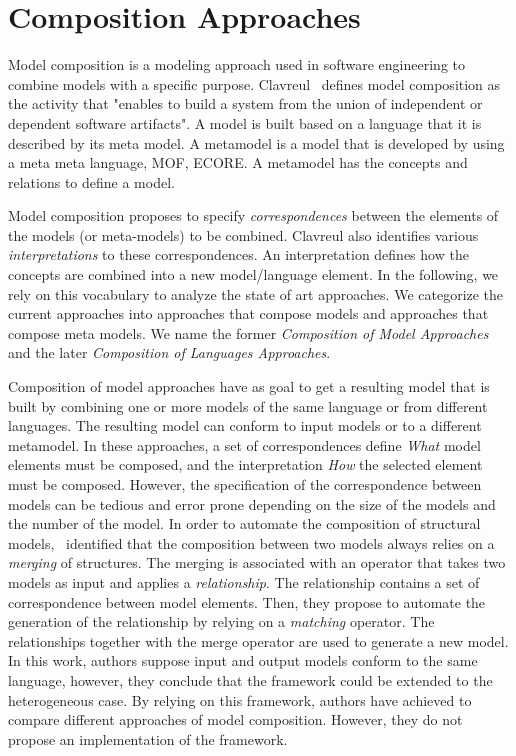 \section{Composition Approaches}
Model composition is a modeling approach used in software engineering to combine models with a specific purpose. Clavreul~\cite{clavreulmodelcompo} defines model composition as the activity that "enables to build a system from the union of independent or dependent software artifacts". A model is built based on a language that it is described by its meta model. A metamodel is a model that is developed by using a meta meta language, \eg MOF, ECORE. A metamodel has the concepts and relations to define a model.

Model composition proposes to specify \emph{correspondences} between the elements of the models (or meta-models) to be combined. Clavreul also identifies various \emph{interpretations} to these correspondences. An interpretation defines how the concepts are combined into a new model/language element. In the following, we rely on this vocabulary to analyze the state of art approaches. We categorize the current approaches into approaches that compose models and approaches that compose meta models. We name the former \emph{Composition of Model Approaches} and the later \emph{Composition of Languages Approaches}.    

Composition of model approaches have as goal to get a resulting model that is built by combining one or more models of the same language or from different languages. The resulting model can conform to input models or to a different metamodel. In these approaches, a set of correspondences define \emph{What} model elements must be composed, and the interpretation \emph{How} the selected element must be composed. However, the specification of the correspondence between models can be tedious and error prone depending on the size of the models and the number of the model. In order to automate the composition of structural models,~\cite{mergemanifest} identified that the composition between two models always relies on a \emph{merging} of structures. The merging is associated with an operator that takes two models as input and applies a \emph{relationship}. The relationship contains a set of correspondence between model elements. Then, they propose to automate the generation of the relationship by relying on a \emph{matching} operator. The relationships together with the merge operator are used to generate a new model. In this work, authors suppose input and output models conform to the same language, however, they conclude that the framework could be extended to the heterogeneous case. By relying on this framework, authors have achieved to compare different approaches of model composition. However, they do not propose an implementation of the framework. 

